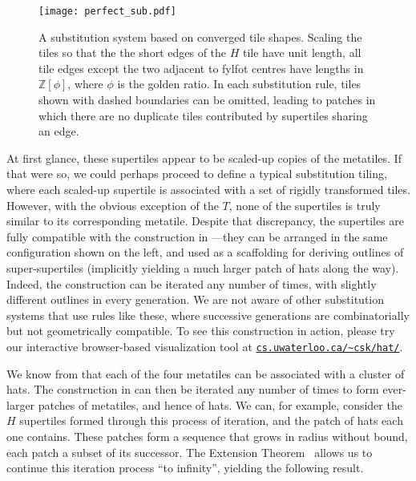 \begin{figure}[ht!]
\begin{center}
\texttt{[image: perfect\_sub.pdf]}
\end{center}
\caption{\label{fig:perfect}A substitution system based on converged
	tile shapes.  Scaling the tiles so that the the short edges of the $H$
	tile have unit length, all tile edges except the two adjacent to fylfot 
	centres
	have lengths in $\mathbb{Z}[\phi]$, where $\phi$ is the golden ratio.
	In each substitution rule, tiles shown with dashed boundaries can be 
	omitted, leading to patches in which there are no duplicate tiles
	contributed by supertiles sharing an edge.}
\end{figure}

At first glance, these supertiles appear to be scaled-up copies
of the metatiles.  If that were so, we could perhaps proceed to
define a typical substitution tiling, where each scaled-up supertile is
associated with a set of rigidly transformed tiles.  However, with
the obvious exception of the $T$, none of the 
supertiles is truly similar to its corresponding metatile.
Despite that discrepancy, the supertiles are fully
compatible with the construction in ---they
can be arranged in the same configuration shown on the left, and used as
a scaffolding for deriving outlines of super-supertiles (implicitly
yielding a much larger patch of hats along the way).  Indeed, the construction
can be iterated any number of times, with slightly different outlines in
every generation.  We are not aware of other substitution systems that
use rules like these, where successive generations are combinatorially
but not geometrically compatible.
To see this construction in action, please try our interactive
browser-based visualization tool at
\href{https://cs.uwaterloo.ca/~csk/hat/}{\nolinkurl{cs.uwaterloo.ca/~csk/hat/}}.

We know from  that each of the four metatiles
can be associated with a cluster of hats.  The construction in
 can then be iterated any number of times to form
ever-larger patches of metatiles, and hence of hats.  We can, for 
example, consider the $H$ supertiles formed through this process of
iteration, and the patch of hats each one contains.  These patches form
a sequence that grows in radius without bound, each patch a subset of
its successor.  The Extension Theorem~\cite[Section 3.8]{GS} allows
us to continue this iteration process ``to infinity'', yielding the
following result.

